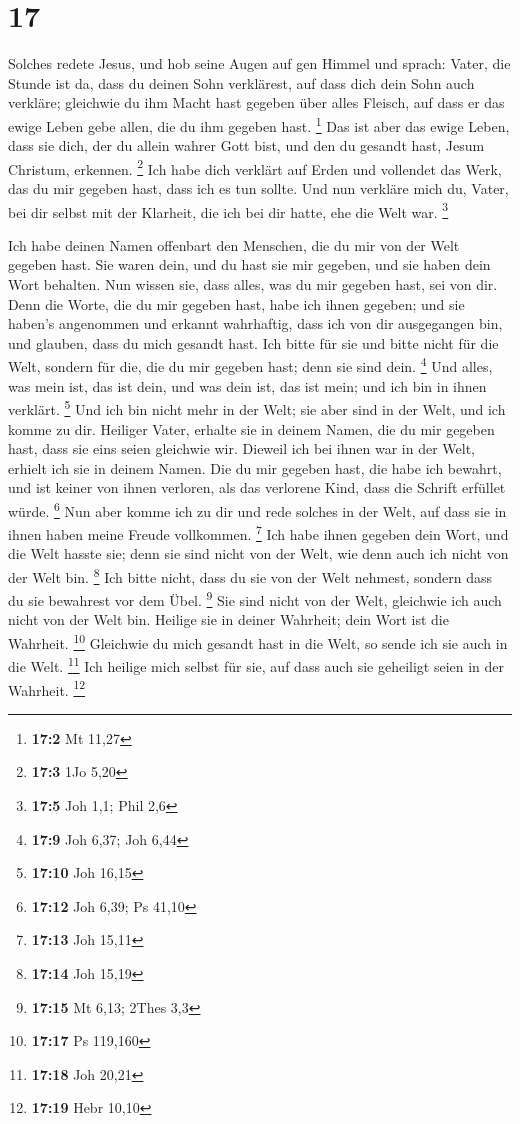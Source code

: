 \hypertarget{section-7}{%
\section{17}\label{section-7}}

 Solches redete Jesus, und hob seine Augen auf gen Himmel
und sprach: Vater, die Stunde ist da, dass du deinen Sohn verklärest,
auf dass dich dein Sohn auch verkläre;  gleichwie du ihm
Macht hast gegeben über alles Fleisch, auf dass er das ewige Leben gebe
allen, die du ihm gegeben hast. \footnote{\textbf{17:2} Mt 11,27}
 Das ist aber das ewige Leben, dass sie dich, der du allein
wahrer Gott bist, und den du gesandt hast, Jesum Christum, erkennen.
\footnote{\textbf{17:3} 1Jo 5,20}  Ich habe dich verklärt
auf Erden und vollendet das Werk, das du mir gegeben hast, dass ich es
tun sollte.  Und nun verkläre mich du, Vater, bei dir selbst
mit der Klarheit, die ich bei dir hatte, ehe die Welt war. \footnote{\textbf{17:5}
  Joh 1,1; Phil 2,6}

 Ich habe deinen Namen offenbart den Menschen, die du mir
von der Welt gegeben hast. Sie waren dein, und du hast sie mir gegeben,
und sie haben dein Wort behalten.  Nun wissen sie, dass
alles, was du mir gegeben hast, sei von dir.  Denn die
Worte, die du mir gegeben hast, habe ich ihnen gegeben; und sie haben's
angenommen und erkannt wahrhaftig, dass ich von dir ausgegangen bin, und
glauben, dass du mich gesandt hast.  Ich bitte für sie und
bitte nicht für die Welt, sondern für die, die du mir gegeben hast; denn
sie sind dein. \footnote{\textbf{17:9} Joh 6,37; Joh 6,44} 
Und alles, was mein ist, das ist dein, und was dein ist, das ist mein;
und ich bin in ihnen verklärt. \footnote{\textbf{17:10} Joh 16,15}
 Und ich bin nicht mehr in der Welt; sie aber sind in der
Welt, und ich komme zu dir. Heiliger Vater, erhalte sie in deinem Namen,
die du mir gegeben hast, dass sie eins seien gleichwie wir.
 Dieweil ich bei ihnen war in der Welt, erhielt ich sie in
deinem Namen. Die du mir gegeben hast, die habe ich bewahrt, und ist
keiner von ihnen verloren, als das verlorene Kind, dass die Schrift
erfüllet würde. \footnote{\textbf{17:12} Joh 6,39; Ps 41,10}
 Nun aber komme ich zu dir und rede solches in der Welt,
auf dass sie in ihnen haben meine Freude vollkommen. \footnote{\textbf{17:13}
  Joh 15,11}  Ich habe ihnen gegeben dein Wort, und die
Welt hasste sie; denn sie sind nicht von der Welt, wie denn auch ich
nicht von der Welt bin. \footnote{\textbf{17:14} Joh 15,19}
 Ich bitte nicht, dass du sie von der Welt nehmest, sondern
dass du sie bewahrest vor dem Übel. \footnote{\textbf{17:15} Mt 6,13;
  2Thes 3,3}  Sie sind nicht von der Welt, gleichwie ich
auch nicht von der Welt bin.  Heilige sie in deiner
Wahrheit; dein Wort ist die Wahrheit. \footnote{\textbf{17:17} Ps
  119,160}  Gleichwie du mich gesandt hast in die Welt, so
sende ich sie auch in die Welt. \footnote{\textbf{17:18} Joh 20,21}
 Ich heilige mich selbst für sie, auf dass auch sie
geheiligt seien in der Wahrheit. \footnote{\textbf{17:19} Hebr 10,10}

